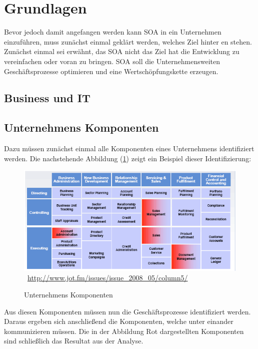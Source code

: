 \section{Grundlagen}
\label{sec:Grundlagen}
Bevor jedoch damit angefangen werden kann SOA in ein Unternehmen einzuführen, muss zunächst einmal geklärt werden, welches Ziel hinter \SOA en stehen. Zunächst einmal sei erwähnt, das SOA nicht das Ziel hat die Entwicklung zu vereinfachen oder voran zu bringen. SOA soll die Unternehmensweiten Geschäftsprozesse optimieren und eine Wertschöpfungskette erzeugen.

\subsection{Business und IT}
\label{subsec:BusinessAndIT}

\subsection{Unternehmens Komponenten}
\label{subsec:UnternehmensKomponenten}
Dazu müssen zunächst einmal alle Komponenten eines Unternehmens identifiziert werden. Die nachstehende Abbildung (\ref{fig:UnternehmensKomponenten}) zeigt ein Beispiel dieser Identifizierung:

\begin{figure}[htb]
    \centering 
    \includegraphics[width=\linewidth]{content/images/UnternehmensKomponenten}\
    \quelle\url{http://www.jot.fm/issues/issue_2008_05/column5/}
    \caption[Unternehmens Komponenten]{Unternehmens Komponenten\\}
    \label{fig:UnternehmensKomponenten}  
\end{figure} 
\newpage
Aus diesen Komponenten müssen nun die Geschäftsprozesse identifiziert werden. Daraus ergeben sich anschließend die Komponenten, welche unter einander kommunizieren müssen. Die in der Abbildung Rot dargestellten Komponenten sind schließlich das Resultat aus der Analyse.


